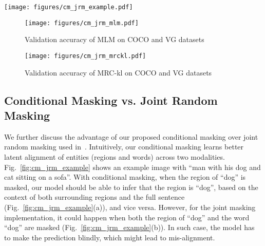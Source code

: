 \documentclass[runningheads]{llncs}
\begin{document}
\begin{figure*}
\centering
\texttt{[image: figures/cm\_jrm\_example.pdf]}
\caption{Example showing difference between conditional masking and joint random masking}\label{fig:cm_jrm_example}
\vspace{-20pt}
\end{figure*}

\begin{figure*}[t]
     \centering
     \begin{subfigure}[b]{0.95\textwidth}
         \centering
         \texttt{[image: figures/cm\_jrm\_mlm.pdf]}
         \caption{\small{Validation accuracy of MLM on COCO and VG datasets}}
     \end{subfigure}
     \begin{subfigure}[b]{0.95\textwidth}
         \centering
         \texttt{[image: figures/cm\_jrm\_mrckl.pdf]}
         \caption{\small{Validation accuracy of MRC-kl on COCO and VG datasets}}
     \end{subfigure}
     \caption{\small{Comparison of MLM and MRC-kl validation accuracy using joint masking and our proposed conditional masking}}
     \label{fig:cm_jrm_val}
     \vspace{-20pt}
\end{figure*}


\subsection{Conditional Masking vs. Joint Random Masking} \label{sec:conditional_masking}
We further discuss the advantage of our proposed conditional masking over joint random masking used in~\cite{tan2019lxmert,lu2019vilbert}.
Intuitively, our conditional masking learns better latent alignment of entities (regions and words) across two modalities. 
Fig.~\ref{fig:cm_jrm_example} shows an example image with ``man with his dog and cat sitting on a sofa''.
With conditional masking, when the region of “dog” is masked, our model should be able to infer that the region is “dog”, based on the context of both surrounding regions and the full sentence (Fig.~\ref{fig:cm_jrm_example}(a)), and vice versa.
However, for the joint masking implementation, it could happen when both the region of “dog” and the word “dog” are masked (Fig.~\ref{fig:cm_jrm_example}(b)). 
In such case, the model has to make the prediction blindly, which might lead to mis-alignment.
\end{document}
